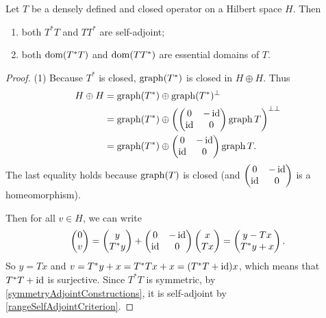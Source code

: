 \begin{theorem} \label{vonNeumannTheoremSquareSelfAdjoint}
Let $T$ be a densely defined and closed operator on a Hilbert space $H$. Then
\begin{enumerate}
\item both $T^*T$ and $TT^*$ are self-adjoint;
\item both $\operatorname{dom}(T^*T)$ and $\operatorname{dom}(TT^*)$ are essential domains of $T$.
\end{enumerate}
\end{theorem}
\begin{proof}
(1) Because $T^*$ is closed, $\operatorname{graph}(T^*)$ is closed in $H\oplus H$. Thus
\begin{align*}
H\oplus H &= \operatorname{graph}(T^*) \oplus \operatorname{graph}(T^*)^\perp \\
&= \operatorname{graph}(T^*) \oplus \left(\begin{pmatrix}
0 & -\operatorname{id} \\ \operatorname{id} & 0
\end{pmatrix}\operatorname{graph}{T}\right)^{\perp\perp} \\
&= \operatorname{graph}(T^*) \oplus \begin{pmatrix}
0 & -\operatorname{id} \\ \operatorname{id} & 0
\end{pmatrix}\operatorname{graph}{T}.
\end{align*}
The last equality holds because $\operatorname{graph}(T)$ is closed (and $\begin{pmatrix}
0 & -\operatorname{id} \\ \operatorname{id} & 0
\end{pmatrix}$ is a homeomorphism).

Then for all $v\in H$, we can write
\[ \begin{pmatrix}
0 \\ v
\end{pmatrix} = \begin{pmatrix}
y \\ T^*y
\end{pmatrix} + \begin{pmatrix}
0 & -\operatorname{id} \\ \operatorname{id} & 0
\end{pmatrix}\begin{pmatrix}
x \\ Tx
\end{pmatrix} = \begin{pmatrix}
y - Tx \\ T^*y + x
\end{pmatrix}. \]
So $y = Tx$ and $v = T^*y + x = T^*Tx + x = (T^*T +\operatorname{id})x$, which means that $T^*T +\operatorname{id}$ is surjective. Since $T^*T$ is symmetric, by \ref{symmetryAdjointConstructions}, it is self-adjoint by \ref{rangeSelfAdjointCriterion}.


\end{proof}
